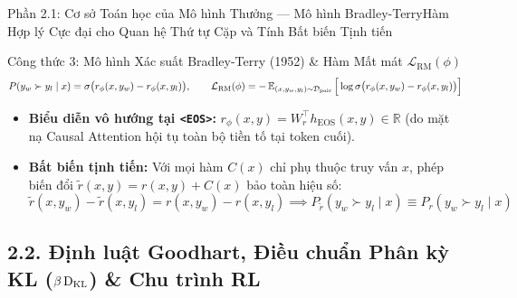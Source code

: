 \begin{frame}{Phần 2.1: Cơ sở Toán học của Mô hình Thưởng --- Mô hình Bradley-Terry}{Hàm Hợp lý Cực đại cho Quan hệ Thứ tự Cặp và Tính Bất biến Tịnh tiến}
  \begin{block}{Công thức 3: Mô hình Xác suất Bradley-Terry (1952) \& Hàm Mất mát $\mathcal{L}_{\text{RM}}(\phi)$}
    \footnotesize
    \[
      P(y_w \succ y_l \mid x) = \sigma\big(r_\phi(x, y_w) - r_\phi(x, y_l)\big), \qquad
      \mathcal{L}_{\text{RM}}(\phi) = -\operatorname{\mathbb{E}}_{(x, y_w, y_l) \sim \mathcal{D}_{\text{pair}}} \Big[ \log \sigma\big(r_\phi(x, y_w) - r_\phi(x, y_l)\big) \Big]
    \]
  \end{block}

  \small
  \begin{itemize}\setlength{\itemsep}{5pt}
    \item \textbf{Biểu diễn vô hướng tại \texttt{<EOS>}:} $r_\phi(x, y) = W_r^\top h_{\text{EOS}}(x, y) \in \mathbb{R}$ (do mặt nạ Causal Attention hội tụ toàn bộ tiền tố tại token cuối).
    \item \textbf{Bất biến tịnh tiến:} Với mọi hàm $C(x)$ chỉ phụ thuộc truy vấn $x$, phép biến đổi $\tilde{r}(x, y) = r(x, y) + C(x)$ bảo toàn hiệu số:
      \[
        \tilde{r}(x, y_w) - \tilde{r}(x, y_l) = r(x, y_w) - r(x, y_l) \implies P_{\tilde{r}}(y_w \succ y_l \mid x) \equiv P_r(y_w \succ y_l \mid x)
      \]
  \end{itemize}
\end{frame}

\subsection{2.2. Định luật Goodhart, Điều chuẩn Phân kỳ KL ($\beta \operatorname{D_{\mathrm{KL}}}$) \& Chu trình RL}

